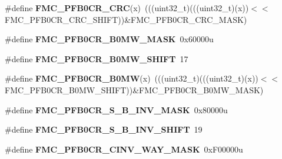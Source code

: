 \begin{DoxyCompactItemize}
\item 
\#define {\bfseries F\+M\+C\+\_\+\+P\+F\+B0\+C\+R\+\_\+\+C\+RC}(x)~(((uint32\+\_\+t)(((uint32\+\_\+t)(x))$<$$<$F\+M\+C\+\_\+\+P\+F\+B0\+C\+R\+\_\+\+C\+R\+C\+\_\+\+S\+H\+I\+FT))\&F\+M\+C\+\_\+\+P\+F\+B0\+C\+R\+\_\+\+C\+R\+C\+\_\+\+M\+A\+SK)\hypertarget{group__FMC__Register__Masks_gadcd46a402d7624898e087fc4bb20c38d}{}\label{group__FMC__Register__Masks_gadcd46a402d7624898e087fc4bb20c38d}

\item 
\#define {\bfseries F\+M\+C\+\_\+\+P\+F\+B0\+C\+R\+\_\+\+B0\+M\+W\+\_\+\+M\+A\+SK}~0x60000u\hypertarget{group__FMC__Register__Masks_gac03a4c507c37a0a18312d87c64e1ec5d}{}\label{group__FMC__Register__Masks_gac03a4c507c37a0a18312d87c64e1ec5d}

\item 
\#define {\bfseries F\+M\+C\+\_\+\+P\+F\+B0\+C\+R\+\_\+\+B0\+M\+W\+\_\+\+S\+H\+I\+FT}~17\hypertarget{group__FMC__Register__Masks_gacfb3dd701c01e307d578e1fd0d048149}{}\label{group__FMC__Register__Masks_gacfb3dd701c01e307d578e1fd0d048149}

\item 
\#define {\bfseries F\+M\+C\+\_\+\+P\+F\+B0\+C\+R\+\_\+\+B0\+MW}(x)~(((uint32\+\_\+t)(((uint32\+\_\+t)(x))$<$$<$F\+M\+C\+\_\+\+P\+F\+B0\+C\+R\+\_\+\+B0\+M\+W\+\_\+\+S\+H\+I\+FT))\&F\+M\+C\+\_\+\+P\+F\+B0\+C\+R\+\_\+\+B0\+M\+W\+\_\+\+M\+A\+SK)\hypertarget{group__FMC__Register__Masks_ga5a6f11afbd35da0cef573491fa35d7b7}{}\label{group__FMC__Register__Masks_ga5a6f11afbd35da0cef573491fa35d7b7}

\item 
\#define {\bfseries F\+M\+C\+\_\+\+P\+F\+B0\+C\+R\+\_\+\+S\+\_\+\+B\+\_\+\+I\+N\+V\+\_\+\+M\+A\+SK}~0x80000u\hypertarget{group__FMC__Register__Masks_ga74a064f6c3eaf054162fde2404485904}{}\label{group__FMC__Register__Masks_ga74a064f6c3eaf054162fde2404485904}

\item 
\#define {\bfseries F\+M\+C\+\_\+\+P\+F\+B0\+C\+R\+\_\+\+S\+\_\+\+B\+\_\+\+I\+N\+V\+\_\+\+S\+H\+I\+FT}~19\hypertarget{group__FMC__Register__Masks_gaa086ecdb24a1217c39116b73aca5ac4f}{}\label{group__FMC__Register__Masks_gaa086ecdb24a1217c39116b73aca5ac4f}

\item 
\#define {\bfseries F\+M\+C\+\_\+\+P\+F\+B0\+C\+R\+\_\+\+C\+I\+N\+V\+\_\+\+W\+A\+Y\+\_\+\+M\+A\+SK}~0x\+F00000u\hypertarget{group__FMC__Register__Masks_gad64b080bc4174e9af7d04246befca017}{}\label{group__FMC__Register__Masks_gad64b080bc4174e9af7d04246befca017}


\end{DoxyCompactItemize}
